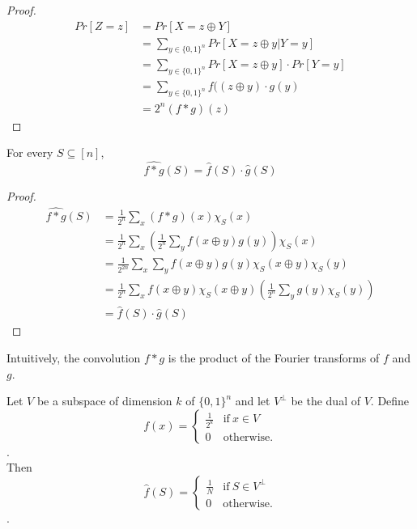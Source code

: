 \begin{proof}

\begin{align*}
Pr[Z = z] 
& = Pr[X = z \oplus Y] \\
& = \sum\limits_{y \in \{0,1\}^n} Pr[X = z \oplus y | Y = y] 	 \\
& = \sum\limits_{y \in \{0,1\}^n} Pr[X = z \oplus y] \cdot Pr[Y =y] \\
& = \sum\limits_{y \in \{0,1\}^n} f((z \oplus y) \cdot g(y) \\
& = 2^n (f *g)(z)
\end{align*}
\end{proof}
\begin{theorem}
For every $S \subseteq [n]$, 
$$\widehat{f*g}(S) = \widehat{f}(S) \cdot \widehat{g}(S)$$
\end{theorem}

\begin{proof}
\begin{align*}
\widehat{f*g}(S) 
& = \frac{1}{2^n}\sum \limits_{x} (f*g)(x) \chi_S(x) \\
& = \frac{1}{2^n} \sum \limits_{x} \left( \frac{1}{2^n} 
	\sum\limits_{y} f(x \oplus y) g(y) \right) \chi_S(x) \\
& = \frac{1}{2^{2n}} \sum\limits_x  \sum\limits_y f(x \oplus y) g(y) 
	\chi_S(x \oplus y) \chi_S(y) \\
& = \frac{1}{2^n}\sum \limits_{x} f(x \oplus y) \chi_S(x \oplus y) 
	\left( \frac{1}{2^n}\sum \limits_{y} g(y) \chi_S(y) \right)\\
& = \widehat{f}(S) \cdot \widehat{g}(S)		
\end{align*}
\end{proof}

Intuitively, the convolution $f * g$ is the product of the Fourier transforms of $f$ and $g$.
\begin{theorem}
Let $V$ be a subspace of dimension $k$ of $\{ 0, 1 \}^n$ and let $V^\perp$ be the dual of $V$. Define \\
 $$f(x) =
\begin{cases}
	\frac{1}{2^k} & \text{if} \ x \in V \\
	0             & \text{otherwise}.
\end{cases}$$. \\
Then
$$\widehat{f}(S) =
\begin{cases}
	\frac{1}{N} & \text{if} \ S \in V^\perp \\
	0             & \text{otherwise}.
\end{cases}$$.
\end{theorem}

